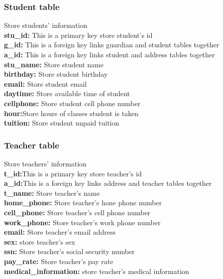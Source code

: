 \subsubsection{Student table}
Store students' information\\
\textbf{stu\_id:} This is a primary key store student's id\\
\textbf{g\_id:} This is a foreign key links guardian and student tables together\\
\textbf{a\_id:} This is a foreign key links student and address tables together\\
\textbf{stu\_name:} Store student name\\
\textbf{birthday:} Store student birthday\\
\textbf{email:} Store student email\\
\textbf{daytime:} Store available time of student\\
\textbf{cellphone:} Store student cell phone number\\
\textbf{hour:}Store hours of classes student is taken\\
\textbf{tuition:} Store student unpaid tuition\\


\subsubsection{Teacher table}
Store teachers' information\\
\textbf{t\_id:}This is a primary key store teacher's id\\
\textbf{a\_id:}This is a foreign key links address and teacher tables together\\
\textbf{t\_name:} Store teacher's name\\
\textbf{home\_phone:} Store teacher's hone phone number\\
\textbf{cell\_phone:} Store teacher's cell phone number\\
\textbf{work\_phone:} Store teacher's work phone number\\
\textbf{email:} Store teacher's email address\\
\textbf{sex:} store teacher's sex\\
\textbf{ssn:} Store teacher's social security number\\
\textbf{pay\_rate:} Store teacher's pay rate\\
\textbf{medical\_information:} store teacher's medical information


